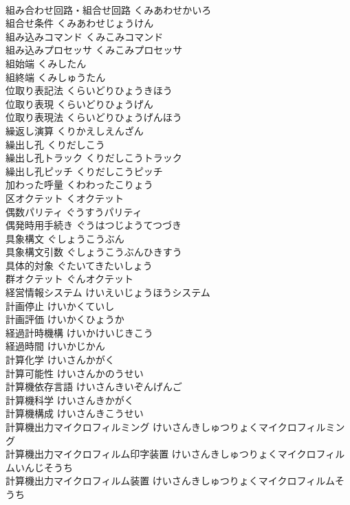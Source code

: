 \documentclass[8pt]{extreport}
\begin{document}
\begin{CJK}{UTF8}{min}
\\	組み合わせ回路・組合せ回路	くみあわせかいろ	
\\	組合せ条件	くみあわせじょうけん	
\\	組み込みコマンド	くみこみコマンド	
\\	組み込みプロセッサ	くみこみプロセッサ	
\\	組始端	くみしたん	
\\	組終端	くみしゅうたん	
\\	位取り表記法	くらいどりひょうきほう	
\\	位取り表現	くらいどりひょうげん	
\\	位取り表現法	くらいどりひょうげんほう	
\\	繰返し演算	くりかえしえんざん	
\\	繰出し孔	くりだしこう	
\\	繰出し孔トラック	くりだしこうトラック	
\\	繰出し孔ピッチ	くりだしこうピッチ	
\\	加わった呼量	くわわったこりょう	
\\	区オクテット	くオクテット	
\\	偶数パリティ	ぐうすうパリティ	
\\	偶発時用手続き	ぐうはつじようてつづき	
\\	具象構文	ぐしょうこうぶん	
\\	具象構文引数	ぐしょうこうぶんひきすう	
\\	具体的対象	ぐたいてきたいしょう	
\\	群オクテット	ぐんオクテット	
\\	経営情報システム	けいえいじょうほうシステム	
\\	計画停止	けいかくていし	
\\	計画評価	けいかくひょうか	
\\	経過計時機構	けいかけいじきこう	
\\	経過時間	けいかじかん	
\\	計算化学	けいさんかがく	
\\	計算可能性	けいさんかのうせい	
\\	計算機依存言語	けいさんきいぞんげんご	
\\	計算機科学	けいさんきかがく	
\\	計算機構成	けいさんきこうせい	
\\	計算機出力マイクロフィルミング	けいさんきしゅつりょくマイクロフィルミング	
\\	計算機出力マイクロフィルム印字装置	けいさんきしゅつりょくマイクロフィルムいんじそうち	
\\	計算機出力マイクロフィルム装置	けいさんきしゅつりょくマイクロフィルムそうち	

\end{CJK}
\end{document}
